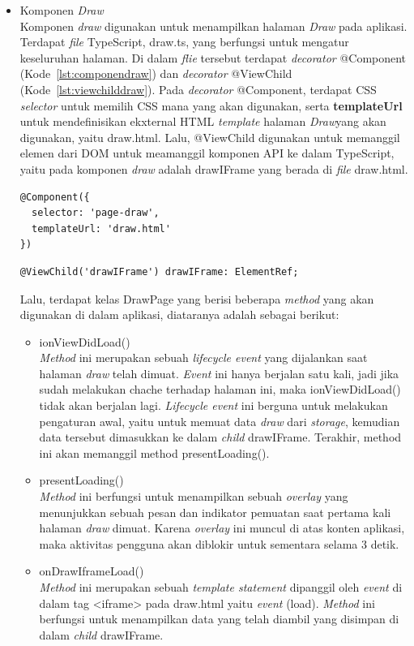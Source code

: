 \begin{itemize}
	\item Komponen \textit{Draw} \\
	Komponen \textit{draw} digunakan untuk menampilkan halaman \textit{Draw} pada aplikasi. Terdapat \textit{file} TypeScript, draw.ts, yang berfungsi untuk mengatur keseluruhan halaman. Di dalam \textit{flie} tersebut terdapat \textit{decorator} @Component (Kode~\ref{lst:componendraw}) dan \textit{decorator} @ViewChild (Kode~\ref{lst:viewchilddraw}). Pada \textit{decorator} @Component, terdapat CSS \textit{selector} untuk memilih CSS mana yang akan digunakan, serta \textbf{templateUrl} untuk mendefinisikan ekxternal HTML \textit{template} halaman \textit{Draw}yang akan digunakan, yaitu draw.html. Lalu, @ViewChild digunakan untuk memanggil elemen dari DOM untuk meamanggil komponen API ke dalam TypeScript, yaitu pada komponen \textit{draw} adalah drawIFrame yang berada di \textit{file} draw.html.
\begin{lstlisting}[language=html, label={lst:componendraw}, caption=@Component pada draw.ts]
@Component({
  selector: 'page-draw',
  templateUrl: 'draw.html'
})
\end{lstlisting} 
	\newpage
\begin{lstlisting}[language=html, label={lst:viewchilddraw}, caption=@ViewChild pada draw.ts]
@ViewChild('drawIFrame') drawIFrame: ElementRef;
\end{lstlisting} 

	Lalu, terdapat kelas DrawPage yang berisi beberapa \textit{method} yang akan digunakan di dalam aplikasi, diataranya adalah sebagai berikut:
	
	\begin{itemize}
		\item ionViewDidLoad() \\
		\textit{Method} ini merupakan sebuah \textit{lifecycle event} yang dijalankan saat halaman \textit{draw} telah dimuat. \textit{Event} ini hanya berjalan satu kali, jadi jika sudah melakukan chache terhadap halaman ini, maka ionViewDidLoad() tidak akan berjalan lagi. \textit{Lifecycle event} ini berguna untuk melakukan pengaturan awal, yaitu untuk memuat data \textit{draw} dari \textit{storage}, kemudian data tersebut dimasukkan ke dalam \textit{child} drawIFrame. Terakhir, method ini akan memanggil method presentLoading().
		\item presentLoading() \\
		\textit{Method} ini berfungsi untuk menampilkan sebuah \textit{overlay} yang menunjukkan sebuah pesan dan indikator pemuatan saat pertama kali halaman \textit{draw} dimuat. Karena \textit{overlay} ini muncul di atas konten aplikasi, maka aktivitas pengguna akan diblokir untuk sementara selama 3 detik.
		\item onDrawIframeLoad() \\
		\textit{Method} ini merupakan sebuah \textit{template statement} dipanggil oleh \textit{event} di dalam tag <iframe> pada draw.html yaitu \textit{event} (load). \textit{Method} ini berfungsi untuk menampilkan data yang telah diambil yang disimpan di dalam \textit{child} drawIFrame.
	\end{itemize}
	

\end{itemize}
